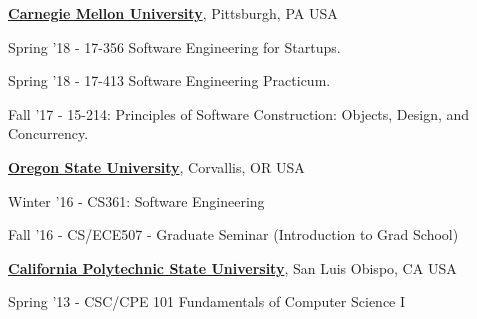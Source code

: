\documentclass[10pt]{article}
\begin{document}
\begin{outerlist}
\item[] \href{https://www.cmu.edu/}{\textbf{Carnegie Mellon University}},
Pittsburgh, PA USA
             \begin{innerlist}
             \item Spring '18 - 17-356 Software Engineering for Startups. 
              \item Spring '18 - 17-413 Software Engineering Practicum.
             \item Fall '17 - 15-214: Principles of Software Construction: Objects, Design, and Concurrency. 
\end{innerlist}





\item[]\href{http://www.oregonstate.edu/}{\textbf{Oregon State University}},
Corvallis, OR USA
             \begin{innerlist}
             \item Winter '16 - CS361: Software Engineering
             \item Fall '16 - CS/ECE507 - Graduate Seminar (Introduction to Grad School)
\end{innerlist}

\item[] \href{http://www.calpoly.edu/}{\textbf{California Polytechnic State University}},
San Luis Obispo, CA USA
             \begin{innerlist}
             \item Spring '13 - CSC/CPE 101 Fundamentals of Computer Science I  
\end{innerlist}
\end{outerlist}
\end{document}
